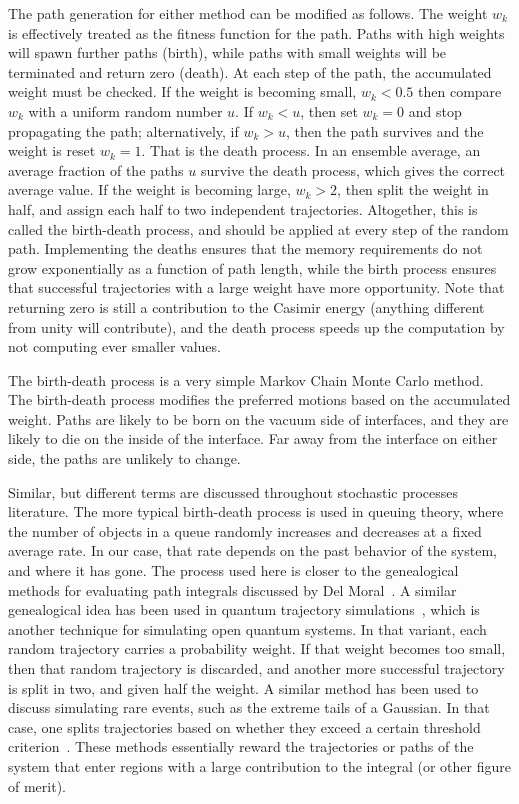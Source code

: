 The path generation for either method can be modified as follows.  The weight $w_k$ is effectively treated as 
the fitness function for the path.  Paths with high weights will spawn further paths (birth), while paths with
small weights will be terminated and return zero (death).  At each step of the path, the 
accumulated weight must be checked.
If the weight is becoming small, $w_k<0.5$ then compare $w_k$ with a uniform random number $u$.
If $w_k<u$, then set $w_k=0$ and stop propagating the path; alternatively, if $w_k>u$, then 
the path survives and the weight is reset $w_k=1$.  That is the death process.
In an ensemble average, an average fraction of the paths $u$ survive the death process, which gives 
the correct average value.
If the weight is becoming large, $w_k>2$, then split the weight in half, and assign each half to 
two independent trajectories.
Altogether, this is called the birth-death process, and should be applied at every step of the random path.
Implementing the deaths ensures that the memory requirements do not grow exponentially as a function 
of path length, while the birth process ensures that successful trajectories with a large weight have 
more opportunity.  Note that returning zero is still a contribution to the Casimir energy (anything different
from unity will contribute), and the death process speeds up the computation by not computing ever smaller
values.

The birth-death process is a very simple Markov Chain Monte Carlo method.  The birth-death
process modifies the preferred motions based on the accumulated weight.  Paths are likely to be born
on the vacuum side of interfaces, and they are likely to die on the inside of the interface.
Far away from the interface on either side, the paths are unlikely to change.  

Similar, but different terms are discussed throughout stochastic processes literature.
The more typical birth-death process is used in queuing theory, where 
the number of objects in a queue randomly increases and decreases at a fixed average rate.
In our case, that rate depends on the past behavior of the system, and where it has gone.  
The process used here is closer to the genealogical methods for evaluating path integrals discussed by Del Moral~\cite{DelMoral2004}.
A similar genealogical idea has been used in quantum trajectory simulations~\cite{Jacobs2010a}, which is another
technique for simulating open quantum systems.  In that variant, each random trajectory carries 
a probability weight.  If that weight becomes too small, then that random trajectory is discarded,
and another more successful trajectory is split in two, and given half the weight.   
A similar method has been used to discuss simulating rare events, such as the extreme tails of a Gaussian.
In that case, one splits trajectories based on whether they exceed a certain threshold criterion~\cite{Glasserman1999,Garvels2000}.
These methods essentially reward the trajectories or paths of the system that enter regions with a large
contribution to the integral (or other figure of merit).  

